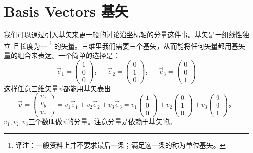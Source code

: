 \section[基矢]{Basis Vectors 基矢}\label{appendix.A.1}
我们可以通过引入基矢来更一般的讨论沿坐标轴的分量这件事。基矢是一组线性独立%
%
且长度为一%
\footnote{译注：一般资料上并不要求最后一条；满足这一条的称为单位基矢。}%
的矢量。三维里我们需要三个基矢，从而能将任何矢量都用基矢量的组合来表达。一个简单的选择是：
\begin{equation}
\vec{e}_1 = \begin{pmatrix}
1 \\ 0 \\ 0
\end{pmatrix}\text{，}\quad
\vec{e}_2 = \begin{pmatrix}
0 \\ 1 \\ 0
\end{pmatrix} \text{，}\quad
\vec{e}_3 = \begin{pmatrix}
0 \\ 0 \\ 1
\end{pmatrix}
\end{equation}
这样任意三维矢量$\vec{v}$都能用基矢表出
\begin{equation}
\vec{v} = \begin{pmatrix}
v_x \\ v_y \\ v_z
\end{pmatrix} = v_1\vec{e}_1 + v_2\vec{e}_2 + v_3\vec{e}_3 =
v_1 \begin{pmatrix}
1 \\ 0 \\ 0
\end{pmatrix}+
v_2  \begin{pmatrix}
0 \\ 1 \\ 0
\end{pmatrix} +
v_3  \begin{pmatrix}
0 \\ 0 \\ 1
\end{pmatrix}\text{。}
\end{equation}
$v_1,v_2,v_3$三个数叫做$\vec{v}$的分量。注意分量是依赖于基矢的。

